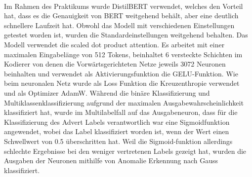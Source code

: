 
\\
Im Rahmen des Praktikums wurde DistilBERT \cite{Sanh2019} verwendet, welches den Vorteil hat, dass es die Genauigkeit von BERT weitgehend behält, aber eine deutlich schnellere Laufzeit hat. Obwohl das Modell mit verschiedenen Einstellungen getestet worden ist, wurden die Standardeinstellungen weitgehend behalten. Das Modell verwendet die scaled dot product attention. Es arbeitet mit einer maximalen Eingabelänge von 512 Tokens, beinhaltet 6 versteckte Schichten im Kodierer von denen die Vorwärtsgerichteten Netze jeweils 3072 Neuronen beinhalten und verwendet als Aktivierungsfunktion die GELU-Funktion. \cite{Hendrycks2016} Wie beim neuronalen Netz wurde als Loss Funktion die Kreuzenthropie verwendet und als Optimizer AdamW. Während die binäre Klassifizierung und Multiklassenklassifizierung aufgrund der maximalen Ausgabewahrscheinlichkeit klassifiziert hat, wurde im Multilabelfall auf das Ausgabeneuron, dass für die Klassifizierung des Advert Labels verantwortlich war eine Sigmoidfunktion angewendet, wobei das Label klassifiziert worden ist, wenn der Wert einen Schwellwert von 0.5 überschritten hat. Weil die Sigmoid-funktion allerdings schlechte Ergebnisse bei den weniger vertretenen Labels gezeigt hat, wurden die Ausgaben der Neuronen mithilfe von Anomalie Erkennung nach Gauss \cite{GaussMashineLearning} klassifiziert.